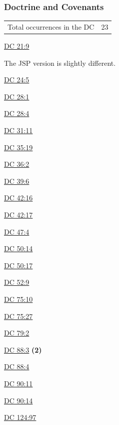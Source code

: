 	\subsubsection{Doctrine and Covenants} %
		\label{COMFORTER-DC}
	
		\begin{tabular}{ll}
			Total occurrences in the DC & 23
		\end{tabular}
		
		\begin{compactdesc}
			\item[{\hyperref[DC21-9]{DC 21:9}}] \phantom{.}
				\begin{compactitem}
					\item The JSP version is slightly different.
				\end{compactitem}
			\item[{\hyperref[DC24-5]{DC 24:5}}] 
			\item[{\hyperref[DC28-1]{DC 28:1}}] 
			\item[{\hyperref[DC28-4]{DC 28:4}}] 
			\item[{\hyperref[DC31-11]{DC 31:11}}] 
			\item[{\hyperref[DC35-19]{DC 35:19}}]
			\item[{\hyperref[DC36-2]{DC 36:2}}]
			\item[{\hyperref[DC39-6]{DC 39:6}}]
			\item[{\hyperref[DC42-16]{DC 42:16}}]
			\item[{\hyperref[DC42-17]{DC 42:17}}]
			\item[{\hyperref[DC47-4]{DC 47:4}}]
			\item[{\hyperref[DC50-14]{DC 50:14}}]
			\item[{\hyperref[DC50-17]{DC 50:17}}]
			\item[{\hyperref[DC52-9]{DC 52:9}}]
			\item[{\hyperref[DC75-10]{DC 75:10}}]
			\item[{\hyperref[DC75-27]{DC 75:27}}]
			\item[{\hyperref[DC79-2]{DC 79:2}}]
			\item[{\hyperref[DC88-3]{DC 88:3}}] \textbf{(2)}
			\item[{\hyperref[DC88-4]{DC 88:4}}]
			\item[{\hyperref[DC90-11]{DC 90:11}}]
			\item[{\hyperref[DC90-14]{DC 90:14}}]
			\item[{\hyperref[DC124-97]{DC 124:97}}]
		\end{compactdesc}
		
